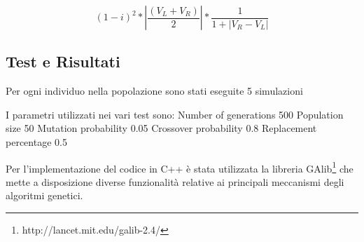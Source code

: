 \documentclass[]{report}
\begin{document}
\[(1-i)^2 * |\dfrac{(V_L+V_R)}{2}| * \dfrac{1}{1+|V_R-V_L|}\]

\subsection{Test e Risultati}

Per ogni individuo nella popolazione sono stati eseguite 5 simulazioni

I parametri utilizzati nei vari test sono:
Number of generations 500
Population size 50
Mutation probability 0.05
Crossover probability 0.8
Replacement percentage 0.5

Per l'implementazione del codice in C++ è stata utilizzata la libreria GAlib\footnote{http://lancet.mit.edu/galib-2.4/} che mette a disposizione diverse funzionalità relative ai principali meccanismi degli algoritmi genetici.






\end{document}
